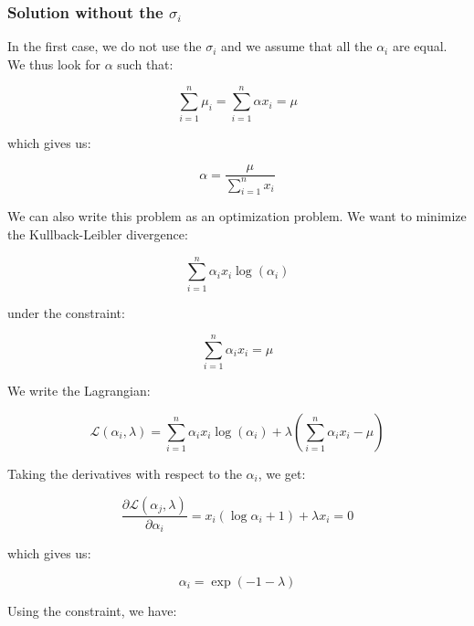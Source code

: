 \subsubsection{Solution without the $\sigma_i$}

In the first case, we do not use the $\sigma_i$ and we assume that all the $\alpha_i$ are equal. We thus look for $\alpha$ such that:

\begin{equation*}
\sum_{i = 1}^n \mu_i = \sum_{i = 1}^n \alpha x_i = \mu
\end{equation*}

which gives us:

\begin{equation}
\alpha = \frac{\mu}{\sum_{i = 1}^n x_i}
\end{equation}

We can also write this problem as an optimization problem. We want to minimize the Kullback-Leibler divergence:

\begin{equation*}
\sum_{i = 1}^n \alpha_i x_i \log \left( \alpha_i \right)
\end{equation*}

under the constraint:

\begin{equation*}
\sum_{i = 1}^n \alpha_i x_i = \mu
\end{equation*}

We write the Lagrangian:

\begin{equation*}
\mathcal{L} \left( \alpha_i, \lambda \right) = \sum_{i = 1}^n \alpha_i x_i \log \left( \alpha_i \right) + \lambda \left( \sum_{i = 1}^n \alpha_i x_i - \mu \right)
\end{equation*}

Taking the derivatives with respect to the $\alpha_i$, we get:

\begin{equation*}
\frac{\partial \mathcal{L} \left(\alpha_j , \lambda \right)}{\partial \alpha_i} = x_i \left( \log \alpha_i + 1 \right) + \lambda x_i = 0
\end{equation*}

which gives us:

\begin{equation*}
\alpha_i = \exp \left( - 1 - \lambda \right)
\end{equation*}

Using the constraint, we have:

